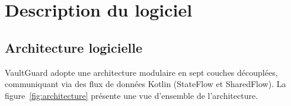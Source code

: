 \documentclass[preprint,12pt, a4paper]{elsarticle}
\begin{document}

\section{Description du logiciel}

\subsection{Architecture logicielle}

VaultGuard adopte une architecture modulaire en sept couches découplées, communiquant via des flux de données Kotlin (StateFlow et SharedFlow). La figure~\ref{fig:architecture} présente une vue d'ensemble de l'architecture.
\end{document}

